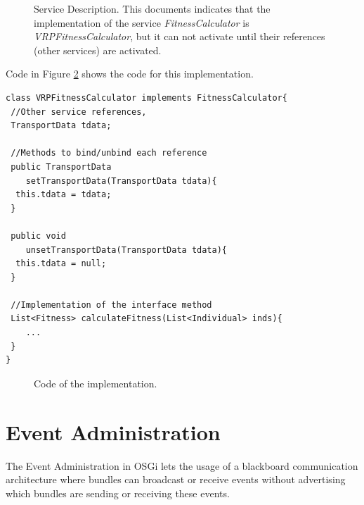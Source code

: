 \begin{figure}
\usebox{\mintedboxOSGIDS}
\caption{Service Description. This documents indicates that the implementation of the service {\em FitnessCalculator} is {\em VRPFitnessCalculator}, but it can not activate until their references (other services) are activated.}
\label{fig:ds} 
\end{figure}

Code in Figure \ref{fig:OSGIspecific} shows the code for this implementation.

\newsavebox{\mintedboxOSGIspecific}
\begin{lrbox}{\mintedboxOSGIspecific}
\begin{minipage}{10cm}
\begin{verbatim}
class VRPFitnessCalculator implements FitnessCalculator{
 //Other service references,
 TransportData tdata;
 
 //Methods to bind/unbind each reference
 public TransportData 
    setTransportData(TransportData tdata){
  this.tdata = tdata;
 }
	
 public void 
    unsetTransportData(TransportData tdata){
  this.tdata = null;
 }

 //Implementation of the interface method
 List<Fitness> calculateFitness(List<Individual> inds){
 	...
 }
}
\end{verbatim}
\end{minipage}
\end{lrbox}

\begin{figure}
\usebox{\mintedboxOSGIspecific}
\caption{Code of the implementation.}
\label{fig:OSGIspecific} 
\end{figure}


\section{Event Administration}
The Event Administration in OSGi lets the usage of a blackboard communication architecture where bundles can broadcast or receive events without advertising which bundles are sending or receiving these events.


